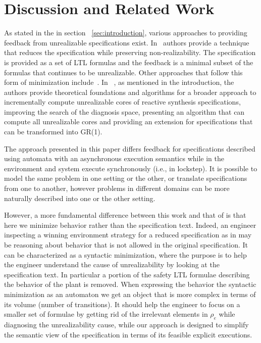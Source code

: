 \section{Discussion and Related Work}\label{sec:discussion}

As stated in the in section ~\ref{sec:introduction}, various approaches to providing feedback from unrealizable specifications exist. In~\cite{DBLP:conf/fmcad/KonighoferHB09} authors provide a technique that reduces the specification while preserving non-realizability. The specification is provided as a set of LTL formulas and the feedback is a minimal subset of the formulas that continues to be unrealizable. Other approaches that follow this form of minimization include~\cite{DBLP:journals/scp/Schuppan12}. In ~\cite{maoz2021unrealizable}, as mentioned in the introduction, the authors provide theoretical foundations and algorithms for a broader approach to incrementally compute unrealizable cores of reactive synthesis specifications, improving the search of the diagnosis space, presenting an algorithm that can compute all unrealizable cores and providing an extension for specifications that can be transformed into GR(1).
 
The approach presented in this paper differs feedback for specifications described using automata with an asynchronous execution semantics while in \cite{DBLP:conf/fmcad/KonighoferHB09} the environment and system execute synchronously (i.e., in lockstep). It is possible to model the same problem in one setting or the other, or translate specifications from one to another, however problems in different domains can  be more naturally described into one or the other setting.

However, a more fundamental difference between this work and that of \cite{DBLP:conf/fmcad/KonighoferHB09} is that here we minimize behavior rather than the specification text. Indeed, an engineer inspecting a winning environment strategy for a reduced specification as in \cite{DBLP:conf/fmcad/KonighoferHB09} may be reasoning about behavior that is not allowed in the original specification.  It can be characterized as a syntactic minimization, where the purpose is to help the engineer understand the cause of unrealizability by looking at the specification text. In particular a portion of the safety LTL formulae describing the behavior of the plant is removed. 
When expressing the behavior the syntactic minimization as an automaton we get an object that is more complex in terms of its volume (number of transitions). 
It should help the engineer to focus on a smaller set of formulae by getting rid of the irrelevant elements in $\rho_e$ while diagnosing the unrealizability cause, while
our approach is designed to simplify the semantic view of the specification in terms of its feasible explicit executions.

